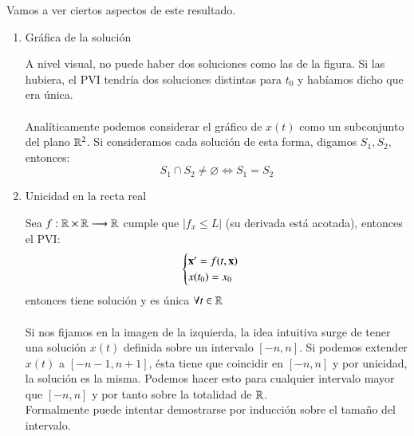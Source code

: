 \begin{obs}
    Vamos a ver ciertos aspectos de este resultado.\\
    \begin{enumerate}
        \item  Gráfica de la solución\\
        \begin{minipage}[c]{0.5\linewidth}
          \begin{center}
          \end{center}
        \end{minipage}\hfill
        \begin{minipage}[c]{0.45\textwidth}
            A nivel visual, no puede haber dos soluciones como las de la figura. Si las hubiera, el PVI tendría dos soluciones distintas para $t_0$ y habíamos dicho que era única.\\\\
            Analíticamente podemos considerar el gráfico de $x(t)$ como un subconjunto del plano $\mathbb{R}^2$. Si consideramos cada solución de esta forma, digamos $S_1, S_2$, entonces:
            $$
                S_1 \cap S_2 \neq \varnothing \iff S_1 = S_2
            $$
        \end{minipage}
        \item Unicidad en la recta real\\
        \begin{minipage}[c]{0.5\linewidth}
          \begin{center}
          \end{center}
        \end{minipage}\hfill
        \begin{minipage}[c]{0.45\textwidth}
            Sea $f: \mathbb{R} \times \mathbb{R} \longrightarrow \mathbb{R}$ cumple que $|f_x \leq L|$ (su derivada está acotada), entonces el PVI:
                $$
                    \begin{cases}
                        \mathbf{x'} = f(t, \mathbf{x})\\
                        x(t_0) = x_0
                    \end{cases}
                $$
            entonces tiene solución y es única $ \forall t \in \mathbb{R}$\\\\
            Si nos fijamos en la imagen de la izquierda, la idea intuitiva surge de tener una solución $x(t)$ definida sobre un intervalo $[-n, n]$. Si podemos extender $x(t)$ a $[-n-1, n+1]$, ésta tiene que coincidir en $[-n,n]$ y por unicidad, la solución es la misma. Podemos hacer esto para cualquier intervalo mayor que $[-n,n]$ y por tanto sobre la totalidad de $\mathbb{R}$.\\Formalmente puede intentar demostrarse por inducción sobre el tamaño del intervalo.
        \end{minipage}
    \end{enumerate}
\end{obs}
